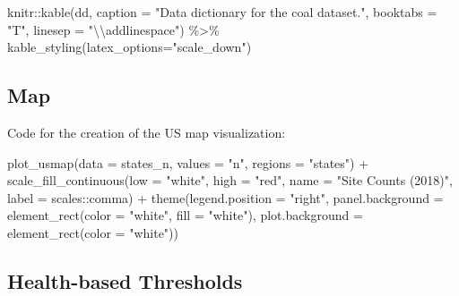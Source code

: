 \documentclass[12pt, twoside]{amherstthesis}
\newenvironment{Shaded}{\begin{snugshade}}{\end{snugshade}}
\newcommand{\AttributeTok}[1]{\textcolor[rgb]{0.77,0.63,0.00}{#1}}
\newcommand{\FunctionTok}[1]{\textcolor[rgb]{0.00,0.00,0.00}{#1}}
\newcommand{\NormalTok}[1]{#1}
\newcommand{\SpecialCharTok}[1]{\textcolor[rgb]{0.00,0.00,0.00}{#1}}
\newcommand{\StringTok}[1]{\textcolor[rgb]{0.31,0.60,0.02}{#1}}
\begin{document}
\begin{Shaded}
\begin{Highlighting}[]
\NormalTok{knitr}\SpecialCharTok{::}\FunctionTok{kable}\NormalTok{(dd, }\AttributeTok{caption =} \StringTok{"Data dictionary for the coal dataset."}\NormalTok{,}
             \AttributeTok{booktabs =} \StringTok{"T"}\NormalTok{, }\AttributeTok{linesep =} \StringTok{"}\SpecialCharTok{\textbackslash{}\textbackslash{}}\StringTok{addlinespace"}\NormalTok{) }\SpecialCharTok{\%\textgreater{}\%}
             \FunctionTok{kable\_styling}\NormalTok{(}\AttributeTok{latex\_options=}\StringTok{"scale\_down"}\NormalTok{)}
\end{Highlighting}
\end{Shaded}
\hypertarget{map}{%
\subsection{Map}\label{map}}

Code for the creation of the US map visualization:
\begin{Shaded}
\begin{Highlighting}[]
\FunctionTok{plot\_usmap}\NormalTok{(}\AttributeTok{data =}\NormalTok{ states\_n, }\AttributeTok{values =} \StringTok{"n"}\NormalTok{, }\AttributeTok{regions =} \StringTok{"states"}\NormalTok{) }\SpecialCharTok{+}
  \FunctionTok{scale\_fill\_continuous}\NormalTok{(}\AttributeTok{low =} \StringTok{"white"}\NormalTok{, }\AttributeTok{high =} \StringTok{"red"}\NormalTok{, }
                        \AttributeTok{name =} \StringTok{"Site Counts (2018)"}\NormalTok{, }
                        \AttributeTok{label =}\NormalTok{ scales}\SpecialCharTok{::}\NormalTok{comma) }\SpecialCharTok{+} 
  \FunctionTok{theme}\NormalTok{(}\AttributeTok{legend.position =} \StringTok{"right"}\NormalTok{,}
        \AttributeTok{panel.background =} \FunctionTok{element\_rect}\NormalTok{(}\AttributeTok{color =} \StringTok{"white"}\NormalTok{, }
                                        \AttributeTok{fill =} \StringTok{"white"}\NormalTok{),}
        \AttributeTok{plot.background =} \FunctionTok{element\_rect}\NormalTok{(}\AttributeTok{color =} \StringTok{"white"}\NormalTok{))}
\end{Highlighting}
\end{Shaded}
\hypertarget{health-based-thresholds}{%
\subsection{Health-based Thresholds}\label{health-based-thresholds}}
\end{document}
